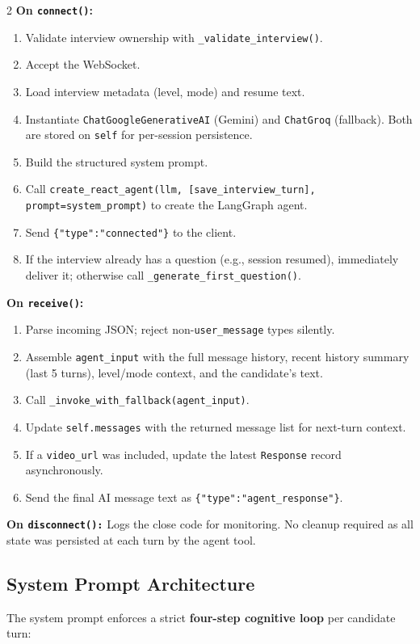 \documentclass[10pt, a4paper]{article}
\begin{document}
\begin{multicols}{2}
\textbf{On \texttt{connect()}:}
\begin{enumerate}
  \item Validate interview ownership with \texttt{\_validate\_interview()}.
  \item Accept the WebSocket.
  \item Load interview metadata (level, mode) and resume text.
  \item Instantiate \texttt{ChatGoogleGenerativeAI} (Gemini) and
        \texttt{ChatGroq} (fallback). Both are stored on \texttt{self} for
        per-session persistence.
  \item Build the structured system prompt.
  \item Call \texttt{create\_react\_agent(llm, [save\_interview\_turn],
        prompt=system\_prompt)} to create the LangGraph agent.
  \item Send \texttt{\{"type":"connected"\}} to the client.
  \item If the interview already has a question (e.g., session resumed),
        immediately deliver it; otherwise call
        \texttt{\_generate\_first\_question()}.
\end{enumerate}

\textbf{On \texttt{receive()}:}
\begin{enumerate}
  \item Parse incoming JSON; reject non-\texttt{user\_message} types silently.
  \item Assemble \texttt{agent\_input} with the full message history,
        recent history summary (last 5 turns), level/mode context, and the
        candidate's text.
  \item Call \texttt{\_invoke\_with\_fallback(agent\_input)}.
  \item Update \texttt{self.messages} with the returned message list for
        next-turn context.
  \item If a \texttt{video\_url} was included, update the latest
        \texttt{Response} record asynchronously.
  \item Send the final AI message text as \texttt{\{"type":"agent\_response"\}}.
\end{enumerate}

\textbf{On \texttt{disconnect():}}
Logs the close code for monitoring. No cleanup required as all state was
persisted at each turn by the agent tool.

\subsection{System Prompt Architecture}
The system prompt enforces a strict \textbf{four-step cognitive loop} per
candidate turn:


\end{multicols}
\end{document}
